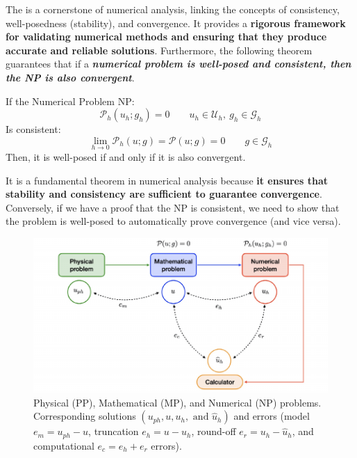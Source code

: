 \newpage

\noindent
The  is a cornerstone of numerical analysis, linking the concepts of consistency, well-posedness (stability), and convergence. It provides a \textbf{rigorous framework for validating numerical methods and ensuring that they produce accurate and reliable solutions}. Furthermore, the following theorem guarantees that if a \textbf{\emph{numerical problem is well-posed and consistent, then the NP is also convergent}}.
\begin{theorem}
    If the Numerical Problem NP:
    \begin{equation*}
        \mathcal{P}_{h}\left(u_{h}; g_{h}\right) = 0 \hspace{2em} u_{h} \in \mathcal{U}_{h}, \: g_{h} \in \mathcal{G}_{h}
    \end{equation*}
    Is consistent:
    \begin{equation*}
        \lim\limits_{h \rightarrow 0}\mathcal{P}_{h}\left(u; g\right) = \mathcal{P}\left(u;g\right) = 0 \hspace{2em} g \in \mathcal{G}_{h}
    \end{equation*}
    Then, it is well-posed if and only if it is also convergent.
\end{theorem}

\noindent
It is a fundamental theorem in numerical analysis because \textbf{it ensures that stability and consistency are sufficient to guarantee convergence}. Conversely, if we have a proof that the NP is consistent, we  need to show that the problem is well-posed to automatically prove convergence (and vice versa).

\highspace
\begin{figure}[!htp]
    \centering
    \includegraphics[width=\textwidth]{img/pp-mp-np-1.pdf}
    \caption{Physical (PP), Mathematical (MP), and Numerical (NP) problems. Corresponding solutions $\left(u_{ph}, u, u_{h}, \text{ and } \widehat{u}_{h}\right)$ and errors (model $e_{m} = u_{ph} - u$, truncation $e_{h} = u - u_{h}$, round-off $e_{r} = u_{h} - \widehat{u}_{h}$, and computational $e_{c} = e_{h} + e_{r}$ errors).}
    \label{fig: PP, MP and NP}
\end{figure}
